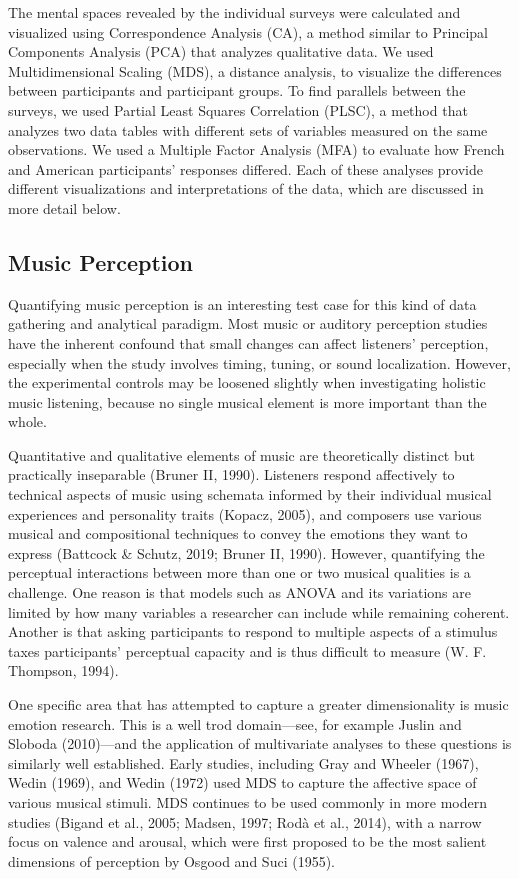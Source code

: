 \documentclass[
  english,
  man,floatsintext]{apa6}
\begin{document}
The mental spaces revealed by the individual surveys were calculated and visualized using Correspondence Analysis (CA), a method similar to Principal Components Analysis (PCA) that analyzes qualitative data. We used Multidimensional Scaling (MDS), a distance analysis, to visualize the differences between participants and participant groups. To find parallels between the surveys, we used Partial Least Squares Correlation (PLSC), a method that analyzes two data tables with different sets of variables measured on the same observations. We used a Multiple Factor Analysis (MFA) to evaluate how French and American participants' responses differed. Each of these analyses provide different visualizations and interpretations of the data, which are discussed in more detail below.

\hypertarget{music-perception}{%
\subsection{Music Perception}\label{music-perception}}

Quantifying music perception is an interesting test case for this kind of data gathering and analytical paradigm. Most music or auditory perception studies have the inherent confound that small changes can affect listeners' perception, especially when the study involves timing, tuning, or sound localization. However, the experimental controls may be loosened slightly when investigating holistic music listening, because no single musical element is more important than the whole.

Quantitative and qualitative elements of music are theoretically distinct but practically inseparable (Bruner II, 1990). Listeners respond affectively to technical aspects of music using schemata informed by their individual musical experiences and personality traits (Kopacz, 2005), and composers use various musical and compositional techniques to convey the emotions they want to express (Battcock \& Schutz, 2019; Bruner II, 1990). However, quantifying the perceptual interactions between more than one or two musical qualities is a challenge. One reason is that models such as ANOVA and its variations are limited by how many variables a researcher can include while remaining coherent. Another is that asking participants to respond to multiple aspects of a stimulus taxes participants' perceptual capacity and is thus difficult to measure (W. F. Thompson, 1994).

One specific area that has attempted to capture a greater dimensionality is music emotion research. This is a well trod domain---see, for example Juslin and Sloboda (2010)---and the application of multivariate analyses to these questions is similarly well established. Early studies, including Gray and Wheeler (1967), Wedin (1969), and Wedin (1972) used MDS to capture the affective space of various musical stimuli. MDS continues to be used commonly in more modern studies (Bigand et al., 2005; Madsen, 1997; Rodà et al., 2014), with a narrow focus on valence and arousal, which were first proposed to be the most salient dimensions of perception by Osgood and Suci (1955).
\end{document}
